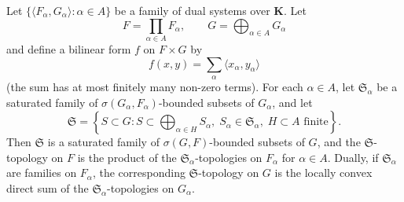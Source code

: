 Let $\{\langle F_\alpha, G_\alpha \rangle : \alpha \in A\}$ be a family of dual systems over $\mathbf{K}$. Let
$$F = \prod_{\alpha \in A} F_\alpha, \qquad G = \bigoplus_{\alpha \in A} G_\alpha$$
and define a bilinear form $f$ on $F \times G$ by
$$f(x, y) = \sum_{\alpha} \langle x_\alpha, y_\alpha \rangle$$
(the sum has at most finitely many non-zero terms). For each $\alpha \in A$, let $\mathfrak{S}_\alpha$ be a saturated family of $\sigma(G_\alpha, F_\alpha)$-bounded subsets of $G_\alpha$, and let
$$\mathfrak{S} = \left\{ S \subset G : S \subset \bigoplus_{\alpha \in H} S_\alpha,\; S_\alpha \in \mathfrak{S}_\alpha,\; H \subset A \text{ finite} \right\}.$$
Then $\mathfrak{S}$ is a saturated family of $\sigma(G, F)$-bounded subsets of $G$, and the $\mathfrak{S}$-topology on $F$ is the product of the $\mathfrak{S}_\alpha$-topologies on $F_\alpha$ for $\alpha \in A$. Dually, if $\mathfrak{S}_\alpha$ are families on $F_\alpha$, the corresponding $\mathfrak{S}$-topology on $G$ is the locally convex direct sum of the $\mathfrak{S}_\alpha$-topologies on $G_\alpha$.
